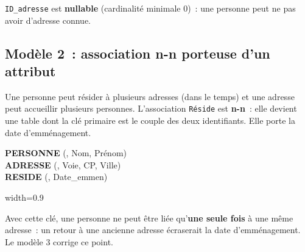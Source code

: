 \vspace{0.5cm}
\noindent \texttt{ID\_adresse} est \textbf{nullable} (cardinalité minimale 0)~: une personne peut ne pas avoir d'adresse connue.

\newpage
\subsection*{Modèle 2~: association n-n porteuse d'un attribut}
{}

\noindent Une personne peut résider à plusieurs adresses (dans le temps) et une adresse peut accueillir plusieurs personnes. L'association \texttt{Réside} est \textbf{n-n}~: elle devient une table dont la clé primaire est le couple des deux identifiants. Elle porte la date d'emménagement.

\begin{tcolorbox}[colback=white, colframe=title1, title=MLD -- Modèle 2]
\textbf{PERSONNE} (, Nom, Prénom) \\
\textbf{ADRESSE} (, Voie, CP, Ville) \\
\textbf{RESIDE} (, Date\_emmen)
\end{tcolorbox}

\vspace{0.5cm}
\begin{center}
\begin{adjustbox}{width=0.9\linewidth}
\end{adjustbox}
\legende
\end{center}

\vspace{0.5cm}
\noindent Avec cette clé, une personne ne peut être liée qu'\textbf{une seule fois} à une même adresse~: un retour à une ancienne adresse écraserait la date d'emménagement. Le modèle 3 corrige ce point.

